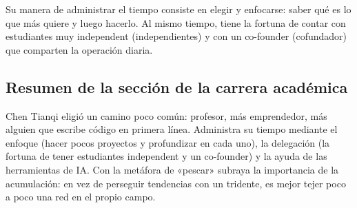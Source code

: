 Su manera de administrar el tiempo consiste en elegir y enfocarse: saber qué es lo que más quiere y luego hacerlo. Al mismo tiempo, tiene la fortuna de contar con estudiantes muy independent (independientes) y con un co-founder (cofundador) que comparten la operación diaria.

\subsection{Resumen de la sección de la carrera académica}

Chen Tianqi eligió un camino poco común: profesor, más emprendedor, más alguien que escribe código en primera línea. Administra su tiempo mediante el enfoque (hacer pocos proyectos y profundizar en cada uno), la delegación (la fortuna de tener estudiantes independent y un co-founder) y la ayuda de las herramientas de IA. Con la metáfora de «pescar» subraya la importancia de la acumulación: en vez de perseguir tendencias con un tridente, es mejor tejer poco a poco una red en el propio campo.
